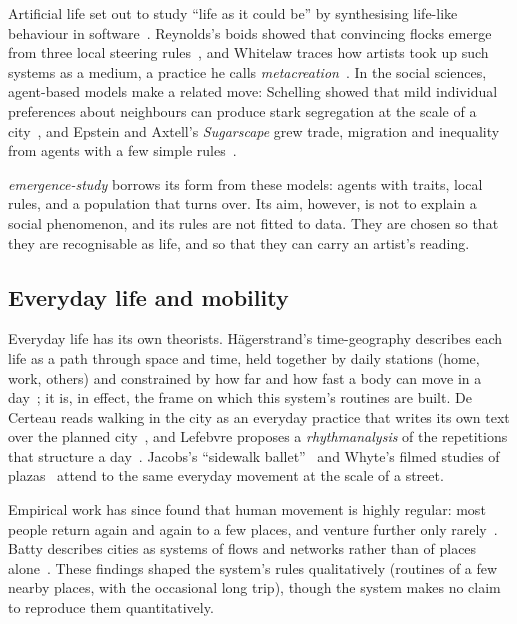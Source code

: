 Artificial life set out to study ``life as it could be'' by synthesising life-like behaviour in software~\cite{langton1989}. Reynolds's boids showed that convincing flocks emerge from three local steering rules~\cite{reynolds1987}, and Whitelaw traces how artists took up such systems as a medium, a practice he calls \emph{metacreation}~\cite{whitelaw2004}. In the social sciences, agent-based models make a related move: Schelling showed that mild individual preferences about neighbours can produce stark segregation at the scale of a city~\cite{schelling1971}, and Epstein and Axtell's \emph{Sugarscape} grew trade, migration and inequality from agents with a few simple rules~\cite{epstein1996}.

\emph{emergence-study} borrows its form from these models: agents with traits, local rules, and a population that turns over. Its aim, however, is not to explain a social phenomenon, and its rules are not fitted to data. They are chosen so that they are recognisable as life, and so that they can carry an artist's reading.

\subsection{Everyday life and mobility}

Everyday life has its own theorists. Hägerstrand's time-geography describes each life as a path through space and time, held together by daily stations (home, work, others) and constrained by how far and how fast a body can move in a day~\cite{hagerstrand1970}; it is, in effect, the frame on which this system's routines are built. De Certeau reads walking in the city as an everyday practice that writes its own text over the planned city~\cite{decerteau1984}, and Lefebvre proposes a \emph{rhythmanalysis} of the repetitions that structure a day~\cite{lefebvre2004}. Jacobs's ``sidewalk ballet''~\cite{jacobs1961} and Whyte's filmed studies of plazas~\cite{whyte1980} attend to the same everyday movement at the scale of a street.

Empirical work has since found that human movement is highly regular: most people return again and again to a few places, and venture further only rarely~\cite{gonzalez2008, song2010}. Batty describes cities as systems of flows and networks rather than of places alone~\cite{batty2013}. These findings shaped the system's rules qualitatively (routines of a few nearby places, with the occasional long trip), though the system makes no claim to reproduce them quantitatively.

